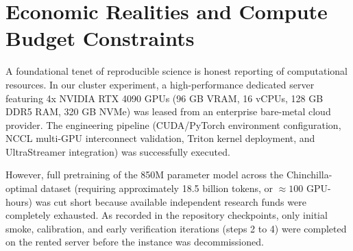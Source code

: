 \documentclass[11pt,a4paper]{article}
\begin{document}
\begin{table}[h]
\centering
\small
\caption{Scientific audit and verification protocol of stabilized TritLLM (\texttt{tritformer\_stable.py}).}
\vspace{0.4em}
\label{tab:audit}
\end{table}

\section{Economic Realities and Compute Budget Constraints}

A foundational tenet of reproducible science is honest reporting of computational resources. In our cluster experiment, a high-performance dedicated server featuring 4x NVIDIA RTX 4090 GPUs (96 GB VRAM, 16 vCPUs, 128 GB DDR5 RAM, 320 GB NVMe) was leased from an enterprise bare-metal cloud provider. The engineering pipeline (CUDA/PyTorch environment configuration, NCCL multi-GPU interconnect validation, Triton kernel deployment, and UltraStreamer integration) was successfully executed.

However, full pretraining of the 850M parameter model across the Chinchilla-optimal dataset (requiring approximately 18.5 billion tokens, or $\approx 100$ GPU-hours) was cut short because available independent research funds were completely exhausted. As recorded in the repository checkpoints, only initial smoke, calibration, and early verification iterations (steps 2 to 4) were completed on the rented server before the instance was decommissioned.
\end{document}
